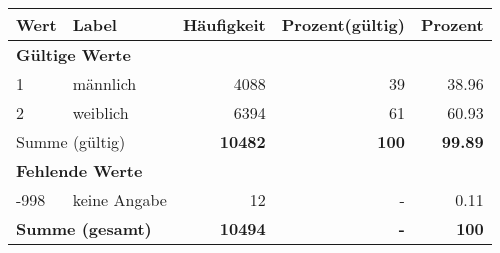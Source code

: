      \begin{longtable}{lXrrr}
     \toprule
     \textbf{Wert} & \textbf{Label} & \textbf{Häufigkeit} & \textbf{Prozent(gültig)} & \textbf{Prozent} \\
     \endhead
     \midrule
     \multicolumn{5}{l}{\textbf{Gültige Werte}}\\

     1 &
     \multicolumn{1}{X}{ männlich   } &


       \num{4088} &
       \num[round-mode=places,round-precision=2]{39} &
         \num[round-mode=places,round-precision=2]{38.96} \\

     2 &
     \multicolumn{1}{X}{ weiblich   } &


       \num{6394} &
       \num[round-mode=places,round-precision=2]{61} &
         \num[round-mode=places,round-precision=2]{60.93} \\
     \midrule
     \multicolumn{2}{l}{Summe (gültig)} &
       \textbf{\num{10482}} &
     \textbf{\num{100}} &
       \textbf{\num[round-mode=places,round-precision=2]{99.89}} \\
     \multicolumn{5}{l}{\textbf{Fehlende Werte}}\\
       -998 &
       keine Angabe &
         \num{12} &
        - &
         \num[round-mode=places,round-precision=2]{0.11} \\
     \midrule
     \multicolumn{2}{l}{\textbf{Summe (gesamt)}} &
          \textbf{\num{10494}} &
        \textbf{-} &
        \textbf{\num{100}} \\
     \bottomrule
     \end{longtable}
     
